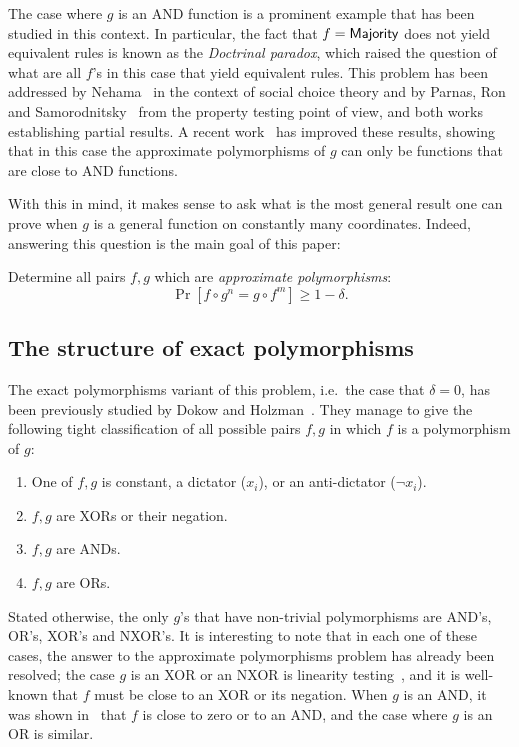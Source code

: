 \documentclass{article}
\theoremstyle{definition}
\theoremstyle{remark}
\renewcommand\geq{\geqslant}
\begin{document}
\begin{enumerate}
    The case where $g$ is an AND function is a prominent example that has been 
    studied in this context. In particular, the fact 
    that $f = {\sf Majority}$ does not yield equivalent rules is known as the 
    \emph{Doctrinal paradox}, which raised the question of what are all $f$'s in
    this case that yield equivalent rules. This problem has been addressed by Nehama~\cite{Nehama} in the context of social choice theory and by Parnas, Ron and Samorodnitsky~\cite{PRS02} from the property testing point of view, and both works establishing partial results. A recent work~\cite{FLMM2020} has 
    improved these results, showing that in this case 
    the approximate polymorphisms of $g$ can only be functions that are close to AND functions.
\end{enumerate}

With this in mind, it makes sense to ask what is the most general result one can prove when $g$ is a general function on constantly many coordinates. Indeed, answering this question is the main goal of this paper:
\begin{tcolorbox}
Determine all pairs $f,g$ which are \emph{approximate polymorphisms}:
\[
 \Pr[f \circ g^n = g \circ f^m] \geq 1-\delta.
\]
\end{tcolorbox}


\subsection{The structure of exact polymorphisms}
The exact polymorphisms variant of this problem, i.e.\ the case that 
$\delta = 0$, has been previously studied by Dokow and Holzman~\cite{DH09}. 
They manage to give the following tight classification of all possible pairs $f,g$ 
in which $f$ is a polymorphism of $g$:
\begin{enumerate}
\item One of $f,g$ is constant, a dictator ($x_i$), or an anti-dictator ($\lnot x_i$).
\item $f,g$ are XORs or their negation.
\item $f,g$ are ANDs.
\item $f,g$ are ORs.
\end{enumerate}
Stated otherwise, the only $g$'s that have non-trivial polymorphisms are 
AND's, OR's, XOR's and NXOR's. It is interesting to note that in each one
of these cases, the answer to the approximate polymorphisms problem has
already been resolved; the case $g$ is an XOR or an NXOR is linearity testing~\cite{BLR,Bellare}, and it is well-known that $f$ must be close to an XOR or its negation. When $g$ is an AND, it was shown in~\cite{FLMM2020} that $f$ is close to zero or to an AND, and the case where $g$ is an OR is similar.
\end{document}
